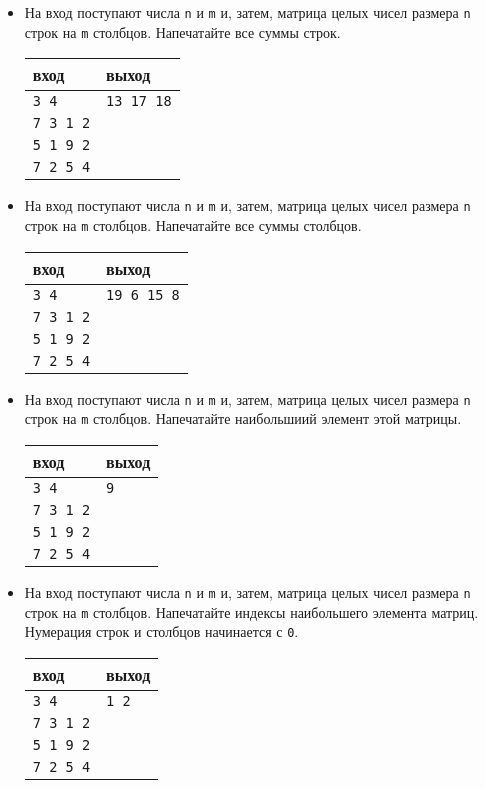 \documentclass{article}
\begin{document}
\begin{itemize}
\item На вход поступают числа \texttt{n} и \texttt{m} и, затем, матрица целых чисел размера \texttt{n} строк на \texttt{m} столбцов. Напечатайте все суммы строк.
\begin{center}
\begin{tabular}{ l | l }
 вход & выход \\ \hline
 \texttt{3 4} & \texttt{13 17 18}  \\ 
 \texttt{7 3 1 2} &  \\ 
 \texttt{5 1 9 2} &  \\ 
 \texttt{7 2 5 4} &  \\ 
\end{tabular}
\end{center}

\item На вход поступают числа \texttt{n} и \texttt{m} и, затем, матрица целых чисел размера \texttt{n} строк на \texttt{m} столбцов. Напечатайте все суммы столбцов.
\begin{center}
\begin{tabular}{ l | l }
 вход & выход \\ \hline
 \texttt{3 4} & \texttt{19 6 15 8}  \\ 
 \texttt{7 3 1 2} &  \\ 
 \texttt{5 1 9 2} &  \\ 
 \texttt{7 2 5 4} &  \\ 
\end{tabular}
\end{center}

\item На вход поступают числа \texttt{n} и \texttt{m} и, затем, матрица целых чисел размера \texttt{n} строк на \texttt{m} столбцов. Напечатайте наибольшиий элемент этой матрицы.
\begin{center}
\begin{tabular}{ l | l }
 вход & выход \\ \hline
 \texttt{3 4} & \texttt{9}  \\ 
 \texttt{7 3 1 2} &  \\ 
 \texttt{5 1 9 2} &  \\ 
 \texttt{7 2 5 4} &  \\ 
\end{tabular}
\end{center}

\item На вход поступают числа \texttt{n} и \texttt{m} и, затем, матрица целых чисел размера \texttt{n} строк на \texttt{m} столбцов. Напечатайте индексы наибольшего элемента матриц. Нумерация строк и столбцов начинается с \texttt{0}.
\begin{center}
\begin{tabular}{ l | l }
 вход & выход \\ \hline
 \texttt{3 4} & \texttt{1 2}  \\ 
 \texttt{7 3 1 2} &  \\ 
 \texttt{5 1 9 2} &  \\ 
 \texttt{7 2 5 4} &  \\ 
\end{tabular}
\end{center}


\end{itemize}
\end{document}
